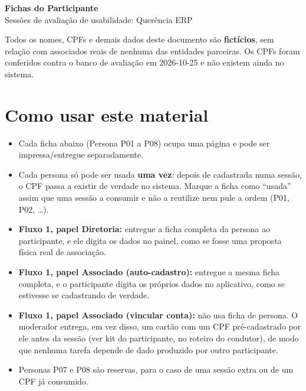 \documentclass[11pt,a4paper]{article}
\begin{document}
\thispagestyle{fancy}
\begin{center}
  {\Large\bfseries\color{brandgreen} Fichas do Participante}\\[2mm]
  {\large Sessões de avaliação de usabilidade: Querência ERP}
\end{center}

\vspace{4mm}
\noindent\colorbox{lightbg}{%
  \begin{minipage}{0.95\linewidth}
  \vspace{1mm}
  Todos os nomes, CPFs e demais dados deste documento são \textbf{fictícios}, sem relação com
  associados reais de nenhuma das entidades parceiras. Os CPFs foram conferidos contra o banco de
  avaliação em 2026-10-25 e não existem ainda no sistema.
  \vspace{1mm}
  \end{minipage}%
}

\section*{Como usar este material}

\begin{itemize}[leftmargin=5mm]
  \item Cada ficha abaixo (Persona P01 a P08) ocupa uma página e pode ser impressa/entregue
    separadamente.
  \item Cada persona só pode ser usada \textbf{uma vez}: depois de cadastrada numa sessão, o CPF
    passa a existir de verdade no sistema. Marque a ficha como ``usada'' assim que uma sessão a
    consumir e não a reutilize nem pule a ordem (P01, P02, \ldots).
  \item \textbf{Fluxo 1, papel Diretoria:} entregue a ficha completa da persona ao participante,
    e ele digita os dados no painel, como se fosse uma proposta física real de associação.
  \item \textbf{Fluxo 1, papel Associado (auto-cadastro):} entregue a mesma ficha completa, e o
    participante digita os próprios dados no aplicativo, como se estivesse se cadastrando de
    verdade.
  \item \textbf{Fluxo 1, papel Associado (vincular conta):} não usa ficha de persona. O moderador
    entrega, em vez disso, um cartão com um CPF pré-cadastrado por ele antes da sessão (ver kit do
    participante, no roteiro do condutor), de modo que nenhuma tarefa depende de dado produzido por outro
    participante.
  \item Personas P07 e P08 são reservas, para o caso de uma sessão extra ou de um CPF já
    consumido.
\end{itemize}
\end{document}
